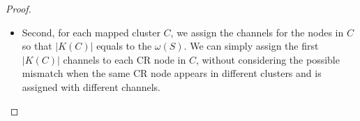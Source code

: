 \documentclass[times]{ettauth}
\newcommand{\ie}{i.e., }
\theoremstyle{mytheoremstyle}
\theoremstyle{mytheoremstyle}
\theoremstyle{mytheoremstyle}
\begin{document}
\begin{proof}
\begin{itemize}
\item Second, for each mapped cluster $C$, we assign the channels for the nodes in $C$ so that $|K(C)|$ equals to the $\omega(S)$.
We can simply assign the first $|K(C)|$ channels to each CR node in $C$, without considering the possible mismatch when the same CR node appears in different clusters and is assigned with different channels.
%






\end{itemize}
\end{proof}
\end{document}
